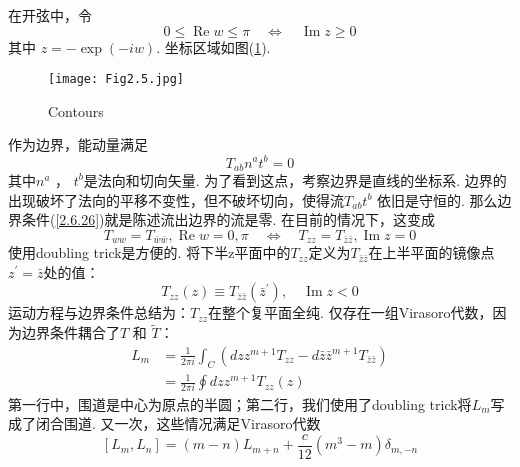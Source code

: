 在开弦中，令
\begin{equation}
0 \leq \operatorname{Re} w \leq \pi \quad \Leftrightarrow \quad \operatorname{Im} z \geq 0
\end{equation}
其中
$z=-\exp (-i w)$. 
坐标区域如图(\ref{Fig2.5}).
\begin{figure}
	\begin{center}
		\texttt{[image: Fig2.5.jpg]}\\
		\caption{Contours}\label{Fig2.5}
	\end{center}
\end{figure}
作为边界，能动量满足
\begin{equation}\label{2.6.26}
T_{a b} n^{a} t^{b}=0
\end{equation}
其中$n^{a}$ ， $t^{b}$是法向和切向矢量. 为了看到这点，考察边界是直线的坐标系. 边界的出现破坏了法向的平移不变性，但不破坏切向，使得流$T_{a b} t^{b}$ 依旧是守恒的. 那么边界条件(\ref{2.6.26})就是陈述流出边界的流是零. 在目前的情况下，这变成
\begin{equation}
T_{w w}=T_{\bar{w} \bar{w}}, \operatorname{Re} w=0, \pi \quad \Leftrightarrow \quad T_{z z}=T_{\bar{z} \bar{z}}, \operatorname{Im} z=0
\end{equation}
使用doubling trick是方便的. 将下半z平面中的$T_{zz}$定义为$T_{\bar{z} \bar{z}}$在上半平面的镜像点$z^{\prime}=\bar{z}$处的值：
\begin{equation}
T_{z z}(z) \equiv T_{\bar{z} \bar{z}}\left(\bar{z}^{\prime}\right), \quad \operatorname{Im} z<0
\end{equation}
运动方程与边界条件总结为：$T_{z z}$在整个复平面全纯.
仅存在一组Virasoro代数，因为边界条件耦合了$T$ 和 $\widetilde{T}$：
\begin{equation}
\begin{aligned}
L_{m} &=\frac{1}{2 \pi i} \int_{C}\left(d z z^{m+1} T_{z z}-d \bar{z} \bar{z}^{m+1} T_{\bar{z} \bar{z}}\right) \\
&=\frac{1}{2 \pi i} \oint d z z^{m+1} T_{z z}(z)
\end{aligned}
\end{equation}
第一行中，围道是中心为原点的半圆；第二行，我们使用了doubling trick将$L_m$写成了闭合围道. 又一次，这些情况满足Virasoro代数
\begin{equation}
\left[L_{m}, L_{n}\right]=(m-n) L_{m+n}+\frac{c}{12}\left(m^{3}-m\right) \delta_{m,-n}
\end{equation}

